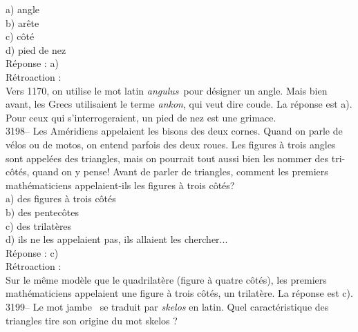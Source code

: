 \documentclass[letterpaper, 12pt]{article}
\begin{document}
a) angle\\
b) ar\^ete\\
c) c\^ot\'e\\
d) pied de nez\\

R\'eponse : a)\\

R\'etroaction :\\
Vers 1170, on utilise le mot latin \og\emph{angulus}\fg \ pour d\'esigner un angle. Mais bien avant, les Grecs utilisaient le terme \og\emph{ankon}\fg, qui veut dire \og coude\fg. La r\'eponse est a). Pour ceux qui s'interrogeraient, un pied de nez est une grimace.\\



3198-- Les Am\'eridiens appelaient les bisons des deux cornes. Quand on parle de v\'elos ou de motos, on entend parfois des deux roues. Les figures \`a trois angles sont appel\'ees des triangles, mais on pourrait tout aussi bien les nommer des tri-c\^ot\'es, quand on y pense! Avant de parler de triangles, comment les premiers math\'ematiciens appelaient-ils les figures \`a trois c\^ot\'es?\\

a) des figures \`a trois c\^ot\'es\\
b) des pentec\^otes\\
c) des trilat\`eres\\
d) ils ne les appelaient pas, ils allaient les chercher...\\

R\'eponse : c)\\

R\'etroaction :\\
Sur le m\^eme mod\`ele que le quadrilat\`ere (figure \`a quatre c\^ot\'es), les premiers math\'ematiciens appelaient une figure \`a trois c\^ot\'es, un trilat\`ere. La r\'eponse est c).\\



3199-- Le mot \og jambe \fg \ se traduit par \emph{skelos} en latin. Quel caract\'eristique des triangles tire son origine du mot \og skelos \fg?\\
\end{document}
